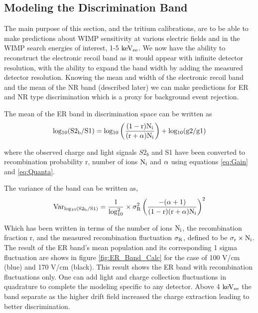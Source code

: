 \subsection{Modeling the Discrimination Band}

The main purpose of this section, and the tritium calibrations, are to be able to make predictions about WIMP sensitivity at various electric fields and in the WIMP search energies of interest, 1-5 $\rm keV_{ee}$. We now have the ability to reconstruct the electronic recoil band as it would appear with infinite detector resolution, with the ability to expand the band width by adding the measured detector resolution. Knowing the mean and width of the electronic recoil band and the mean of the NR band (described later) we can make predictions for ER and NR type discrimination which is a proxy for background event rejection.  

The mean of the ER band in discrimination space can be written as
\begin{equation}
\rm log_{10}(S2_b/S1) = log_{10} \left(\frac{(1-r)N_i}{(r+\alpha)N_i}\right) + log_{10}(g2/g1)
\label{eq:Band_Mean}
\end{equation}

\noindent where the observed charge and light signals $S2_b$ and S1 have been converted to recombination probability r,  number of ions $\rm N_i$ and $\rm \alpha$ using equations \ref{eq:Gain} and \ref{eq:Quanta}.

The variance of the band can be written as,
\begin{equation}
\rm Var_{log_{10}(S2_b/S1)} = \frac{1}{log_{10}^2} \times \sigma_R^2 \left( \frac{ - (\alpha+1) }{(1-r)(r+\alpha)N_i} \right)^2
\label{eq:Band_Var}
\end{equation}

\noindent Which has been written in terms of the number of ions $\rm N_i$, the recombination fraction r, and the measured recombination fluctuation $\rm \sigma_R$, defined to be $\rm \sigma_r\times N_i$. The result of the ER band's mean population and its corresponding 1 sigma fluctuation are shows in figure \ref{fig:ER_Band_Calc} for the case of 100 V/cm (blue) and 170 V/cm (black). This result shows the ER band with recombination fluctuations only. One can add light and charge collection fluctuations in quadrature to complete the modeling specific to any detector. Above 4 $\rm keV_{ee}$ the band separate as the higher drift field increased the charge extraction leading to better discrimination.

